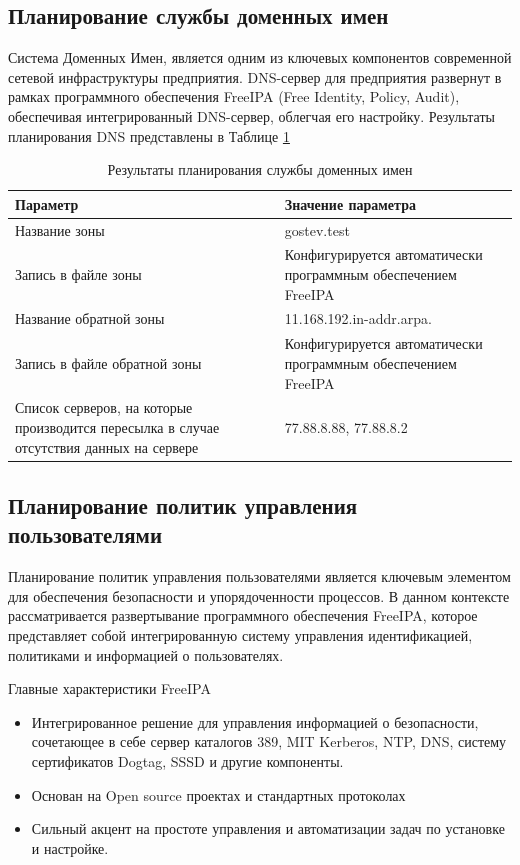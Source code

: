 \documentclass[14pt, a4paper]{extarticle}
\numberwithin{equation}{section}
\begin{document}
\subsection{Планирование службы доменных имен}
Система Доменных Имен, является одним из ключевых компонентов современной 
сетевой инфраструктуры предприятия. 
DNS-сервер для предприятия развернут в рамках программного
обеспечения FreeIPA (Free Identity, Policy, Audit), обеспечивая интегрированный
DNS-сервер, облегчая его настройку.
Результаты планирования DNS представлены в Таблице \ref{table:dns_plan}

\begin{table}[H]
\centering
\small
\label{table:dns_plan}
\caption{Результаты планирования службы доменных имен}
\begin{tabular}{|m{6cm}|m{10cm}|}
\hline
\textbf{Параметр} & \textbf{Значение параметра} \\
\hline
Название зоны &  gostev.test \\
\hline
Запись в файле зоны &  Конфигурируется автоматически программным обеспечением FreeIPA\\
\hline
Название обратной зоны &  11.168.192.in-addr.arpa.\\
\hline
Запись в файле обратной зоны &  Конфигурируется автоматически программным обеспечением FreeIPA\\
\hline
Список серверов, на которые производится пересылка в случае отсутствия данных на сервере &  77.88.8.88, 77.88.8.2\\
\hline
\end{tabular}
\end{table}




\subsection{Планирование политик управления пользователями}
Планирование политик управления пользователями является ключевым элементом для 
обеспечения безопасности и упорядоченности процессов. 
В данном контексте рассматривается развертывание программного обеспечения 
FreeIPA, которое представляет собой интегрированную систему управления идентификацией, 
политиками и информацией о пользователях.

Главные характеристики FreeIPA
\begin{itemize}
        \item Интегрированное решение для управления информацией о безопасности, 
        сочетающее в себе сервер каталогов 389, MIT Kerberos, 
        NTP, DNS, систему сертификатов Dogtag, SSSD и другие компоненты.
        \item Основан на Open source проектах и стандартных протоколах
        \item Сильный акцент на простоте управления и автоматизации задач по установке и настройке.
\end{itemize}
\end{document}

